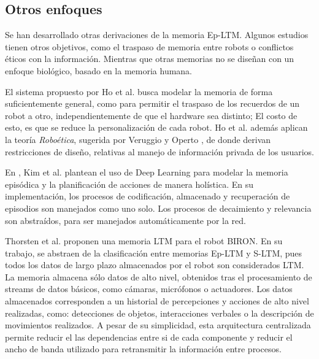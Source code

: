 



\subsection{Otros enfoques}

Se han desarrollado otras derivaciones de la memoria Ep-LTM. Algunos estudios tienen otros objetivos, como el traspaso de memoria entre robots o conflictos éticos con la información. Mientras que otras memorias no se diseñan con un enfoque biológico, basado en la memoria humana.

El sistema propuesto por Ho et al. \cite{Ho2009} busca modelar la memoria de forma suficientemente general, como para permitir el traspaso de los recuerdos de un robot a otro, independientemente de que el hardware sea distinto; El costo de esto, es que se reduce la personalización de cada robot. Ho et al. además aplican la teoría \textit{Roboética}, sugerida por Veruggio y Operto \cite{Veruggio2006}, de donde derivan restricciones de diseño, relativas al manejo de información privada de los usuarios.

En \cite{KimMinJoo2016}, Kim et al. plantean el uso de Deep Learning para modelar la memoria episódica y la planificación de acciones de manera holística. En su implementación, los procesos de codificación, almacenado y recuperación de episodios son manejados como uno solo. Los procesos de decaimiento y relevancia son abstraídos, para ser manejados automáticamente por la red.

Thorsten et al. \cite{Spexard2008} proponen una memoria LTM para el robot BIRON. En su trabajo, se abstraen de la clasificación entre memorias Ep-LTM y S-LTM, pues todos los datos de largo plazo almacenados por el robot son considerados LTM. La memoria almacena sólo datos de alto nivel, obtenidos tras el procesamiento de streams de datos básicos, como cámaras, micrófonos o actuadores. Los datos almacenados corresponden a un historial de percepciones y acciones de alto nivel realizadas, como: detecciones de objetos, interacciones verbales o la descripción de movimientos realizados. A pesar de su simplicidad, esta arquitectura centralizada permite reducir el las dependencias entre si de cada componente y reducir el ancho de banda utilizado para retransmitir la información entre procesos.




